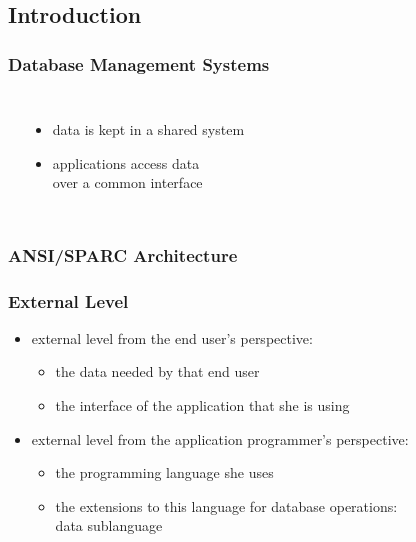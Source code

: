 \documentclass[dvipsnames]{beamer}
\theoremstyle{plain}
\begin{document}
\subsection{Introduction}

\begin{frame}
  \frametitle{Database Management Systems}

  \begin{columns}[b]
    \begin{center}
    \end{center}

    \begin{itemize}
      \item data is kept in a shared system
      \item applications access data\\
        over a common interface
    \end{itemize}
  \end{columns}
\end{frame}

\begin{frame}
  \frametitle{ANSI/SPARC Architecture}

  \begin{center}
  \end{center}
\end{frame}

\begin{frame}
  \frametitle{External Level}

  \begin{itemize}
    \item external level from the end user's perspective:
    \begin{itemize}
      \item the data needed by that end user
      \item the interface of the application that she is using
    \end{itemize}

    \pause
    \bigskip
    \item external level from the application programmer's perspective:
    \begin{itemize}
      \item the programming language she uses
      \item the extensions to this language for database operations:\\
        \alert{data sublanguage}
    \end{itemize}
  \end{itemize}
\end{frame}
\end{document}
